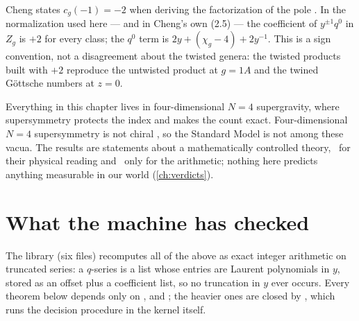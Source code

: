 \begin{remark}
Cheng states $c_g(-1)=-2$ when deriving the factorization of the pole
. In the normalization used here --- and in Cheng's own (2.5) --- the
coefficient of $y^{\pm1}q^0$ in $Z_g$ is $+2$ for every class; the $q^0$ term is
$2y+(\chi_g-4)+2y^{-1}$. This is a sign convention, not a disagreement about the twisted
genera: the twisted products built with $+2$ reproduce the untwisted product at $g=1A$ and the
twined Göttsche numbers at $z=0$.
\end{remark}

\begin{pitfallbox}[This is $N=4$, not our universe]
Everything in this chapter lives in four-dimensional $N=4$ supergravity, where supersymmetry
protects the index and makes the count exact. Four-dimensional $N=4$ supersymmetry is not
chiral , so the Standard Model is not among these vacua. The
results are statements about a mathematically controlled theory, \TL\ for their physical
reading and \TA\ only for the arithmetic; nothing here predicts anything measurable in our
world (\cref{ch:verdicts}).
\end{pitfallbox}

\section{What the machine has checked}\label{sec:dyons:lean}

The library  (six files) recomputes all of the above as exact integer
arithmetic on truncated series: a $q$-series is a list whose entries are Laurent polynomials in
$y$, stored as an offset plus a coefficient list, so no truncation in $y$ ever occurs. Every
theorem below depends only on ,  and ;
the heavier ones are closed by , which runs the decision procedure in the
kernel itself.

